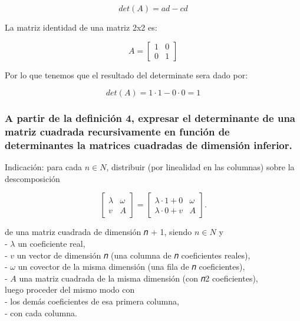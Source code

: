 \documentclass[11pt]{article}
\begin{document}
\begin{equation}
det(A) =ad-cd
\end{equation}

La matriz identidad de una matriz 2x2 es:

\begin{equation}
A =
\begin{bmatrix}
1 & 0 \\
0 & 1
\end{bmatrix}
\end{equation}

Por lo que tenemos que el resultado del determinate sera dado por:

\begin{equation}
det(A) = 1 \cdot 1-0 \cdot 0 = 1
\end{equation}

    \subsubsection{A partir de la definición 4, expresar el determinante de
una matriz cuadrada recursivamente en función de determinantes la
matrices cuadradas de dimensión
inferior.}\label{a-partir-de-la-definiciuxf3n-4-expresar-el-determinante-de-una-matriz-cuadrada-recursivamente-en-funciuxf3n-de-determinantes-la-matrices-cuadradas-de-dimensiuxf3n-inferior.}

Indicación: para cada \(n ∈ N\), distribuir (por linealidad en las
columnas) sobre la descomposición

\begin{equation}
\begin{bmatrix}
\lambda & \omega \\
v & A
\end{bmatrix} = \begin{bmatrix}
\lambda \cdot 1 + 0 & \omega \\
\lambda \cdot 0 + v & A
\end{bmatrix}.
\end{equation}

de una matriz cuadrada de dimensión 𝑛 + 1, siendo \(n ∈ N\) y\\
- \(𝜆\) un coeficiente real,\\
- \(𝑣\) un vector de dimensión 𝑛 (una columna de 𝑛 coeficientes
reales),\\
- \(𝜔\) un covector de la misma dimensión (una fila de 𝑛
coeficientes),\\
- \(𝐴\) una matriz cuadrada de la misma dimensión (con 𝑛2
coeficientes),\\
luego proceder del mismo modo con\\
- los demás coeficientes de esa primera columna,\\
- con cada columna.\\
\end{document}

